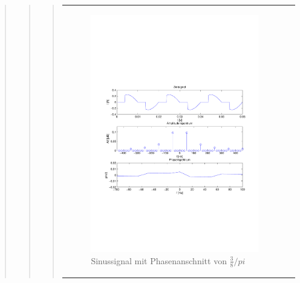 \begin{quote}
\begin{quote}
\begin{quote}
\begin{center}
\begin{tabular}{ll}
\begin{minipage}{0.6\textwidth}
                    \end{minipage}
                    \begin{minipage}{0.6\textwidth}
    
                         \begin{figure}[H]
                            \label{fig:}
                            \includegraphics[scale=0.5, trim = 1.5cm 7cm 1.5cm 8.5cm,
                            clip]{./Bilder/Phasenanschnitt38pi.pdf} %
                            \caption{Sinussignal mit Phasenanschnitt von $\frac{3}{8}/pi$}
                        \end{figure}
                   \vspace{-1.5em}
    
                    \end{minipage}
    

\end{tabular}
\end{center}
\end{quote}
\end{quote}
\end{quote}
